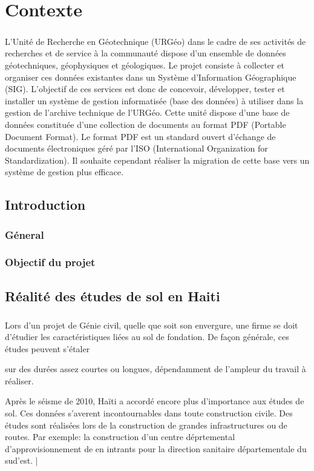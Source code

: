 \chapter{Contexte}
\paragraph{}
L’Unité de Recherche en Géotechnique (URGéo) dans le cadre de ses activités de recherches et de service à
la communauté dispose d’un ensemble de données géotechniques, géophysiques et géologiques. Le projet
consiste à collecter et organiser ces données existantes dans un Système d’Information Géographique (SIG).
L’objectif de ces services est donc de concevoir, développer, tester et installer un système de gestion
informatisée (base des données) à utiliser dans la gestion de l’archive technique de l’URGéo. Cette unité
dispose d'une base de données constituée d’une collection de documents au format PDF (Portable Document
Format). Le format PDF est un standard ouvert d'échange de documents électroniques géré par l’ISO
(International Organization for Standardization). Il souhaite cependant réaliser la migration de cette base vers
un système de gestion plus efficace.
    \section{Introduction}
        \subsection{Géneral}
        \lipsum[1]
        \subsection{Objectif du projet}
        \lipsum[1]
    \section{Réalité des études de sol en Haiti}
    \paragraph{}
    Lors d'un projet de Génie civil, quelle que soit son envergure, une firme se doit d'étudier 
    les caractéristiques liées au sol de fondation. De façon générale, ces études peuvent s'étaler 

    sur des durées assez courtes ou longues, dépendamment de l'ampleur du travail à réaliser.
    \par
    Après le séisme de 2010, Haïti a accordé encore plus d'importance aux études de sol. Ces données s'averent 
    incontournables dans toute construction civile. Des études sont réalisées lors de la construction de grandes infrastructures ou de routes.
    Par exemple: la construction d'un centre déprtemental d'approvisionnement de en intrants pour la direction sanitaire 
    départementale du sud'est. \cite{realisation_geotechsol} |
    


